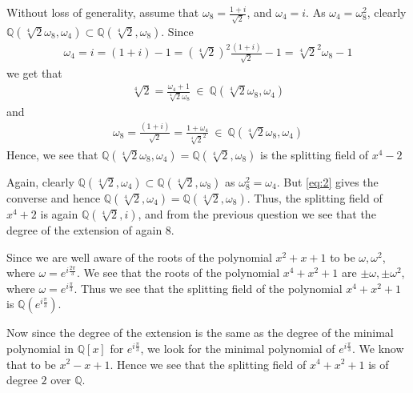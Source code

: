 \documentclass[12pt]{exam}
\theoremstyle{plain} %
\theoremstyle{definition} %
\theoremstyle{remark} %
\begin{document}
\begin{questions}
\begin{solution}
    Without loss of generality, assume that $\omega_8 =
    \frac{1+i}{\sqrt{2}}$, and $\omega_4 = i$. As $\omega_4 =
    \omega_8^2$, clearly $\mathbb{Q}(\sqrt[4]{2}\omega_8, \omega_4) \subset
    \mathbb{Q}(\sqrt[4]{2}, \omega_8)$. Since
    \begin{align*}
      \omega_4 = i = (1+i) - 1 = (\sqrt[4]{2})^2
      \frac{(1+i)}{\sqrt{2}} - 1 = \sqrt[4]{2}^2 \omega_8 - 1
    \end{align*}
    we get that
    \begin{align*}
      \sqrt[4]{2} = \frac{\omega_4+1}{\sqrt[4]{2}\omega_8} \ \in \
      \mathbb{Q}(\sqrt[4]{2}\omega_8, \omega_4)
    \end{align*}
    and
    \begin{align}
      \label{eq:2}
      \omega_8 = \frac{(1+i)}{\sqrt{2}} =
      \frac{1+\omega_4}{\sqrt[4]{2}^2} \ \in
      \ \mathbb{Q}(\sqrt[4]{2}\omega_8, \omega_4)
    \end{align}
    Hence, we see that $\mathbb{Q}(\sqrt[4]{2}\omega_8, \omega_4) =
    \mathbb{Q}(\sqrt[4]{2}, \omega_8)$ is the splitting field of $x^4 - 2$

    Again, clearly $\mathbb{Q}(\sqrt[4]{2}, \omega_4) \subset
    \mathbb{Q}(\sqrt[4]{2}, \omega_8)$ as $\omega_8^2 = \omega_4$.
    But \autoref{eq:2} gives the converse and hence
    $\mathbb{Q}(\sqrt[4]{2}, \omega_4) =
    \mathbb{Q}(\sqrt[4]{2}, \omega_8)$. Thus, the splitting field of
    $x^4 + 2$ is again $\mathbb{Q}(\sqrt[4]{2}, i)$, and from the previous
    question we see that the degree of the extension of again $8$.
  \end{solution}

  \question
  \begin{solution}
    Since we are well aware of the roots of the polynomial $x^2 + x +
    1$ to be $\omega, \omega^2$, where $\omega = e^{i
    \frac{2\pi}{3}}$. We see that the roots of the polynomial $x^4 +
    x^2 + 1$ are $\pm \omega, \pm \omega^2$, where $\omega = e^{i
    \frac{\pi}{3}}$. Thus we see that the splitting field of the
    polynomial $x^4 + x^2 + 1$ is $\mathbb{Q}(e^{i \frac{\pi}{3}})$.

    Now since the degree of the extension is the same as
    the degree of the minimal polynomial in $\mathbb{Q}[x]$ for $e^{i
    \frac{\pi}{3}}$, we look for the minimal polynomial of $e^{i
    \frac{\pi}{3}}$. We know that to be $x^2 - x + 1$. Hence we see
    that the splitting field of $x^4 + x^2 + 1$ is of degree $2$ over
    $\mathbb{Q}$.
  \end{solution}


\end{questions}
\end{document}
